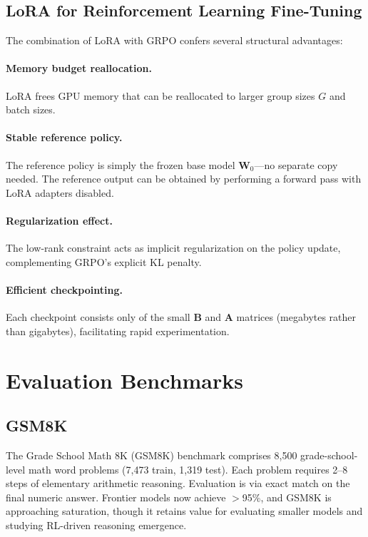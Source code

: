 \documentclass[12pt,a4paper]{report}
\begin{document}
\subsection{LoRA for Reinforcement Learning Fine-Tuning}

The combination of LoRA with GRPO confers several structural advantages:

\paragraph{Memory budget reallocation.} LoRA frees GPU memory that can be reallocated to larger group sizes $G$ and batch sizes.

\paragraph{Stable reference policy.} The reference policy is simply the frozen base model $\mathbf{W}_0$---no separate copy needed. The reference output can be obtained by performing a forward pass with LoRA adapters disabled.

\paragraph{Regularization effect.} The low-rank constraint acts as implicit regularization on the policy update, complementing GRPO's explicit KL penalty.

\paragraph{Efficient checkpointing.} Each checkpoint consists only of the small $\mathbf{B}$ and $\mathbf{A}$ matrices (megabytes rather than gigabytes), facilitating rapid experimentation.


\section{Evaluation Benchmarks}
\label{sec:math-benchmarks}

\subsection{GSM8K}

The Grade School Math 8K (GSM8K) benchmark \cite{cobbe2021gsm8k} comprises 8,500 grade-school-level math word problems (7,473 train, 1,319 test). Each problem requires 2--8 steps of elementary arithmetic reasoning. Evaluation is via exact match on the final numeric answer. Frontier models now achieve $>$95\%, and GSM8K is approaching saturation, though it retains value for evaluating smaller models and studying RL-driven reasoning emergence.
\end{document}
